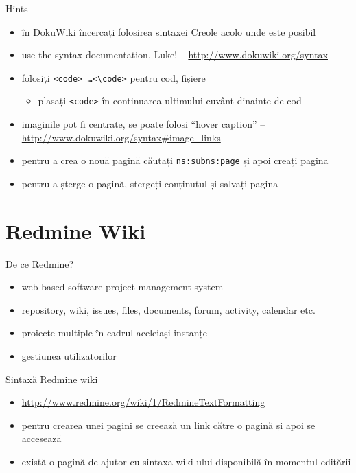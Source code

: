\documentclass{beamer}
\begin{document}
\begin{frame}{Hints}
  \begin{itemize}
    \pause \item în DokuWiki încercați folosirea sintaxei Creole acolo unde este
posibil
    \pause \item use the syntax documentation, Luke! --
\url{http://www.dokuwiki.org/syntax}
    \pause \item folosiți \texttt{<code> \ldots <\textbackslash{}code>} pentru cod,
fișiere
      \begin{itemize}
        \pause \item plasați \texttt{<code>} în continuarea ultimului cuvânt
dinainte de cod
      \end{itemize}
    \pause \item imaginile pot fi centrate, se poate folosi ``hover caption'' --
\url{http://www.dokuwiki.org/syntax\#image\_links}
    \pause \item pentru a crea o nouă pagină căutați \texttt{ns:subns:page} și apoi
creați pagina
    \pause \item pentru a șterge o pagină, ștergeți conținutul și salvați pagina
  \end{itemize}
\end{frame}

\section{Redmine Wiki}

\frame{\tableofcontents[currentsection]}

\begin{frame}{De ce Redmine?}
  \begin{itemize}
    \pause \item web-based software project management system
    \pause \item repository, wiki, issues, files, documents, forum, activity,
calendar etc.
    \pause \item proiecte multiple în cadrul aceleiași instanțe
    \pause \item gestiunea utilizatorilor
  \end{itemize}
\end{frame}

\begin{frame}{Sintaxă Redmine wiki}
  \begin{itemize}
    \item \url{http://www.redmine.org/wiki/1/RedmineTextFormatting}
    \item pentru crearea unei pagini se creează un link către o pagină și apoi
se accesează
    \item există o pagină de ajutor cu sintaxa wiki-ului disponibilă în
momentul editării
  \end{itemize}
\end{frame}
\end{document}
